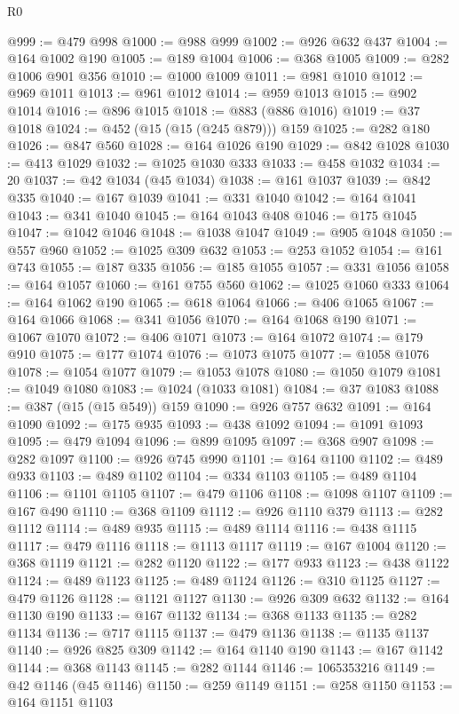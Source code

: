\begin{lexlean}{R0}
\begin{coremodule}
@999 := @479 @998
@1000 := @988 @999
@1002 := @926 @632 @437
@1004 := @164 @1002 @190
@1005 := @189 @1004
@1006 := @368 @1005
@1009 := @282 @1006 @901 @356
@1010 := @1000 @1009
@1011 := @981 @1010
@1012 := @969 @1011
@1013 := @961 @1012
@1014 := @959 @1013
@1015 := @902 @1014
@1016 := @896 @1015
@1018 := @883 (@886 @1016)
@1019 := @37 @1018
@1024 := @452 (@15 (@15 (@245 @879))) @159
@1025 := @282 @180
@1026 := @847 @560
@1028 := @164 @1026 @190
@1029 := @842 @1028
@1030 := @413 @1029
@1032 := @1025 @1030 @333
@1033 := @458 @1032
@1034 := 20
@1037 := @42 @1034 (@45 @1034)
@1038 := @161 @1037
@1039 := @842 @335
@1040 := @167 @1039
@1041 := @331 @1040
@1042 := @164 @1041
@1043 := @341 @1040
@1045 := @164 @1043 @408
@1046 := @175 @1045
@1047 := @1042 @1046
@1048 := @1038 @1047
@1049 := @905 @1048
@1050 := @557 @960
@1052 := @1025 @309 @632
@1053 := @253 @1052
@1054 := @161 @743
@1055 := @187 @335
@1056 := @185 @1055
@1057 := @331 @1056
@1058 := @164 @1057
@1060 := @161 @755 @560
@1062 := @1025 @1060 @333
@1064 := @164 @1062 @190
@1065 := @618 @1064
@1066 := @406 @1065
@1067 := @164 @1066
@1068 := @341 @1056
@1070 := @164 @1068 @190
@1071 := @1067 @1070
@1072 := @406 @1071
@1073 := @164 @1072
@1074 := @179 @910
@1075 := @177 @1074
@1076 := @1073 @1075
@1077 := @1058 @1076
@1078 := @1054 @1077
@1079 := @1053 @1078
@1080 := @1050 @1079
@1081 := @1049 @1080
@1083 := @1024 (@1033 @1081)
@1084 := @37 @1083
@1088 := @387 (@15 (@15 @549)) @159
@1090 := @926 @757 @632
@1091 := @164 @1090
@1092 := @175 @935
@1093 := @438 @1092
@1094 := @1091 @1093
@1095 := @479 @1094
@1096 := @899 @1095
@1097 := @368 @907
@1098 := @282 @1097
@1100 := @926 @745 @990
@1101 := @164 @1100
@1102 := @489 @933
@1103 := @489 @1102
@1104 := @334 @1103
@1105 := @489 @1104
@1106 := @1101 @1105
@1107 := @479 @1106
@1108 := @1098 @1107
@1109 := @167 @490
@1110 := @368 @1109
@1112 := @926 @1110 @379
@1113 := @282 @1112
@1114 := @489 @935
@1115 := @489 @1114
@1116 := @438 @1115
@1117 := @479 @1116
@1118 := @1113 @1117
@1119 := @167 @1004
@1120 := @368 @1119
@1121 := @282 @1120
@1122 := @177 @933
@1123 := @438 @1122
@1124 := @489 @1123
@1125 := @489 @1124
@1126 := @310 @1125
@1127 := @479 @1126
@1128 := @1121 @1127
@1130 := @926 @309 @632
@1132 := @164 @1130 @190
@1133 := @167 @1132
@1134 := @368 @1133
@1135 := @282 @1134
@1136 := @717 @1115
@1137 := @479 @1136
@1138 := @1135 @1137
@1140 := @926 @825 @309
@1142 := @164 @1140 @190
@1143 := @167 @1142
@1144 := @368 @1143
@1145 := @282 @1144
@1146 := 1065353216
@1149 := @42 @1146 (@45 @1146)
@1150 := @259 @1149
@1151 := @258 @1150
@1153 := @164 @1151 @1103

\end{coremodule}
\end{lexlean}
